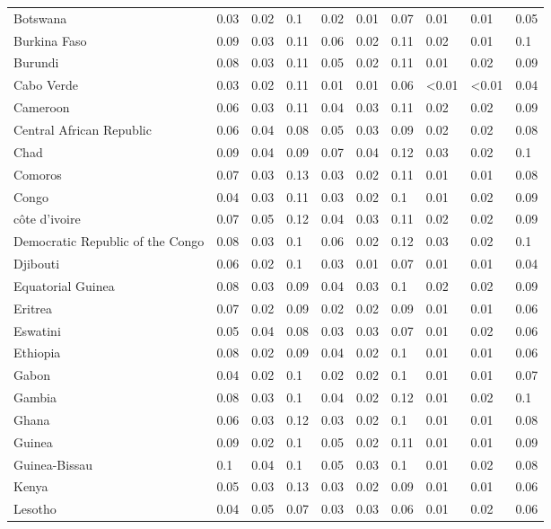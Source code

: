 \begin{longtable}[t]{llllllllll}
Botswana & 0.03 & 0.02 & 0.1 & 0.02 & 0.01 & 0.07 & 0.01 & 0.01 & 0.05\\
Burkina Faso & 0.09 & 0.03 & 0.11 & 0.06 & 0.02 & 0.11 & 0.02 & 0.01 & 0.1\\
Burundi & 0.08 & 0.03 & 0.11 & 0.05 & 0.02 & 0.11 & 0.01 & 0.02 & 0.09\\
Cabo Verde & 0.03 & 0.02 & 0.11 & 0.01 & 0.01 & 0.06 & <0.01 & <0.01 & 0.04\\
\addlinespace
Cameroon & 0.06 & 0.03 & 0.11 & 0.04 & 0.03 & 0.11 & 0.02 & 0.02 & 0.09\\
Central African Republic & 0.06 & 0.04 & 0.08 & 0.05 & 0.03 & 0.09 & 0.02 & 0.02 & 0.08\\
Chad & 0.09 & 0.04 & 0.09 & 0.07 & 0.04 & 0.12 & 0.03 & 0.02 & 0.1\\
Comoros & 0.07 & 0.03 & 0.13 & 0.03 & 0.02 & 0.11 & 0.01 & 0.01 & 0.08\\
Congo & 0.04 & 0.03 & 0.11 & 0.03 & 0.02 & 0.1 & 0.01 & 0.02 & 0.09\\
\addlinespace
côte d'ivoire & 0.07 & 0.05 & 0.12 & 0.04 & 0.03 & 0.11 & 0.02 & 0.02 & 0.09\\
Democratic Republic of the Congo & 0.08 & 0.03 & 0.1 & 0.06 & 0.02 & 0.12 & 0.03 & 0.02 & 0.1\\
Djibouti & 0.06 & 0.02 & 0.1 & 0.03 & 0.01 & 0.07 & 0.01 & 0.01 & 0.04\\
Equatorial Guinea & 0.08 & 0.03 & 0.09 & 0.04 & 0.03 & 0.1 & 0.02 & 0.02 & 0.09\\
Eritrea & 0.07 & 0.02 & 0.09 & 0.02 & 0.02 & 0.09 & 0.01 & 0.01 & 0.06\\
\addlinespace
Eswatini & 0.05 & 0.04 & 0.08 & 0.03 & 0.03 & 0.07 & 0.01 & 0.02 & 0.06\\
Ethiopia & 0.08 & 0.02 & 0.09 & 0.04 & 0.02 & 0.1 & 0.01 & 0.01 & 0.06\\
Gabon & 0.04 & 0.02 & 0.1 & 0.02 & 0.02 & 0.1 & 0.01 & 0.01 & 0.07\\
Gambia & 0.08 & 0.03 & 0.1 & 0.04 & 0.02 & 0.12 & 0.01 & 0.02 & 0.1\\
Ghana & 0.06 & 0.03 & 0.12 & 0.03 & 0.02 & 0.1 & 0.01 & 0.01 & 0.08\\
\addlinespace
Guinea & 0.09 & 0.02 & 0.1 & 0.05 & 0.02 & 0.11 & 0.01 & 0.01 & 0.09\\
Guinea-Bissau & 0.1 & 0.04 & 0.1 & 0.05 & 0.03 & 0.1 & 0.01 & 0.02 & 0.08\\
Kenya & 0.05 & 0.03 & 0.13 & 0.03 & 0.02 & 0.09 & 0.01 & 0.01 & 0.06\\
Lesotho & 0.04 & 0.05 & 0.07 & 0.03 & 0.03 & 0.06 & 0.01 & 0.02 & 0.06\\

\end{longtable}
